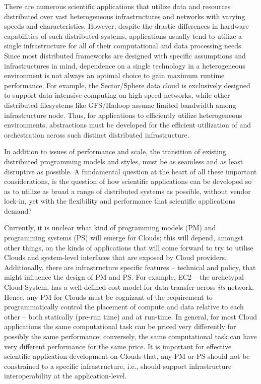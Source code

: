 \documentclass[3p,twocolumn]{elsarticle}
\begin{document}
There are numerous scientific applications that utilize data and
resources distributed over vast heterogeneous infrastructures and
networks with varying speeds and characteristics. However, despite the
drastic differences in hardware capabilities of such distributed
systems, applications usually tend to utilize a single infrastructure
for all of their computational and data processing needs. Since most
distributed frameworks are designed with specific assumptions and
infrastructures in mind, dependence on a single technology in a
heterogeneous environment is not always an optimal choice to gain
maximum runtime performance. For example, the Sector/Sphere data cloud
is exclusively designed to support data-intensive computing on high
speed networks, while other distributed filesystems like GFS/Hadoop
assume limited bandwidth among infrastructure node\cite{}. Thus, for
applications to efficiently utilize heterogeneous environments,
abstractions must be developed for the efficient utilization of and
orchestration across such distinct distributed infrastructure. 

In addition to issues of performance and scale, the transition of
existing distributed programming models and styles, must be as
seamless and as least disruptive as possible.  A fundamental question
at the heart of all these important considerations, is the question of
how scientific applications can be developed so as to utilize as broad
a range of distributed systems as possible, without vendor lock-in,
yet with the flexibility and performance that scientific applications
demand?

Currently, it is unclear what kind of programming models (PM) and
programming systems (PS) will emerge for Clouds; this will
depend, amongst other things, on the kinds of applications that will
come forward to try to utilise Clouds and system-level interfaces that
are exposed by Cloud providers.  Additionally, there are
infrastructure specific features -- technical and policy, that might
influence the design of PM and PS. For example, EC2 -- the archetypal
Cloud System, has a well-defined cost model for data transfer across
{\it its} network. Hence, any PM for Clouds must be cognizant of the
requirement to programmatically control the placement of compute and
data relative to each other -- both statically (pre-run time) and at
run-time.  In general, for most Cloud applications the same
computational task can be priced very differently for possibly the
same performance; conversely, the same computational task can have
very different performance for the same price. It is important for
effective scientific application development on Clouds that, any PM or
PS should not be constrained to a specific infrastructure, i.e.,
should support infrastructure interoperability at the
application-level.
\end{document}
